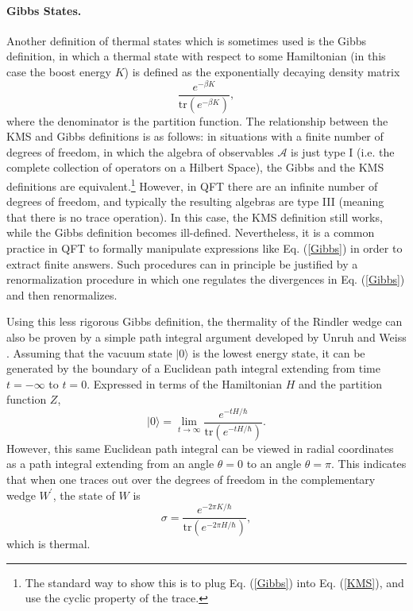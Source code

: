\documentclass{article}
\begin{document}
\paragraph{Gibbs States.} Another definition of thermal states which is sometimes used is the Gibbs definition, in which a thermal state with respect to some Hamiltonian (in this case the boost energy $K$) is defined as the exponentially decaying density matrix
\begin{equation}\label{Gibbs}
\frac{e^{-\beta K}}{\mathrm{tr}(e^{-\beta K})},
\end{equation}
where the denominator is the partition function.  The relationship between the KMS and Gibbs definitions is as follows: in situations with a finite number of degrees of freedom, in which the algebra of observables $\mathcal{A}$ is just type I (i.e. the complete collection of operators on a Hilbert Space), the Gibbs and the KMS definitions are equivalent.\footnote{The standard way to show this is to plug Eq. (\ref{Gibbs}) into Eq. (\ref{KMS}), and use the cyclic property of the trace.}  However, in QFT there are an infinite number of degrees of freedom, and typically the resulting algebras are type III (meaning that there is no trace operation).  In this case, the KMS definition still works, while the Gibbs definition becomes ill-defined.  Nevertheless, it is a common practice in QFT to formally manipulate expressions like Eq. (\ref{Gibbs}) in order to extract finite answers.  Such procedures can in principle be justified by a renormalization procedure in which one regulates the divergences in Eq. (\ref{Gibbs}) and then renormalizes.

Using this less rigorous Gibbs definition, the thermality of the Rindler wedge can also be proven by a simple path integral argument developed by Unruh and Weiss \cite{UW84}.  Assuming that the vacuum state $|0\rangle$ is the lowest energy state, it can be generated by the boundary of a Euclidean path integral extending from time $t = -\infty$ to $t = 0$.  Expressed in terms of the Hamiltonian $H$ and the partition function $Z$,
\begin{equation}
|0\rangle = \lim_{t \to \infty} \frac{e^{- tH / \hbar}}{\mathrm{tr}(e^{- tH / \hbar})}.
\end{equation}
However, this same Euclidean path integral can be viewed in radial coordinates as a path integral extending from an angle $\theta = 0$ to an angle $\theta = \pi$.  This indicates that when one traces out over the degrees of freedom in the complementary wedge $W^\prime$, the state of $W$ is
\begin{equation}
\sigma = \frac{e^{-2 \pi K/\hbar}}{\mathrm{tr}(e^{- 2\pi H / \hbar})},
\end{equation}
which is thermal.
\end{document}
